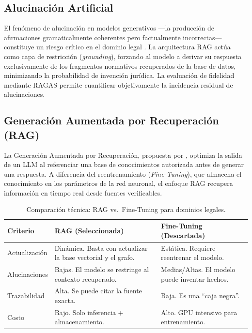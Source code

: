 \documentclass[12pt, letterpaper]{report}
\begin{document}
\subsection{Alucinaci\'{o}n Artificial}

El fen\'{o}meno de alucinaci\'{o}n en modelos generativos ---la producci\'{o}n de afirmaciones gramaticalmente coherentes pero factualmente incorrectas--- constituye un riesgo cr\'{i}tico en el dominio legal \cite{maynez2020}. La arquitectura RAG act\'{u}a como capa de restricci\'{o}n (\textit{grounding}), forzando al modelo a derivar su respuesta exclusivamente de los fragmentos normativos recuperados de la base de datos, minimizando la probabilidad de invenci\'{o}n jur\'{i}dica. La evaluaci\'{o}n de fidelidad mediante RAGAS permite cuantificar objetivamente la incidencia residual de alucinaciones.

\subsection{Generaci\'{o}n Aumentada por Recuperaci\'{o}n (RAG)}

La Generaci\'{o}n Aumentada por Recuperaci\'{o}n, propuesta por \textcite{lewis2020}, optimiza la salida de un LLM al referenciar una base de conocimientos autorizada antes de generar una respuesta. A diferencia del reentrenamiento (\textit{Fine-Tuning}), que almacena el conocimiento en los par\'{a}metros de la red neuronal, el enfoque RAG recupera informaci\'{o}n en tiempo real desde fuentes verificables.

\begin{table}[H]
  \centering
  \renewcommand{\arraystretch}{1.3}
  \caption{Comparaci\'{o}n t\'{e}cnica: RAG vs.\ Fine-Tuning para dominios legales.}
  \label{tab:rag_vs_finetuning}
  \begin{tabular}{|p{}|p{}|p{}|}
  \hline
  \textbf{Criterio} & \textbf{RAG (Seleccionada)} & \textbf{Fine-Tuning (Descartada)} \\ \hline
  Actualizaci\'{o}n & Din\'{a}mica. Basta con actualizar la base vectorial y el grafo. & Est\'{a}tica. Requiere reentrenar el modelo. \\ \hline
  Alucinaciones & Bajas. El modelo se restringe al contexto recuperado. & Medias/Altas. El modelo puede inventar hechos. \\ \hline
  Trazabilidad & Alta. Se puede citar la fuente exacta. & Baja. Es una ``caja negra''. \\ \hline
  Costo & Bajo. Solo inferencia + almacenamiento. & Alto. GPU intensivo para entrenamiento. \\ \hline
  \end{tabular}
\end{table}
\end{document}

